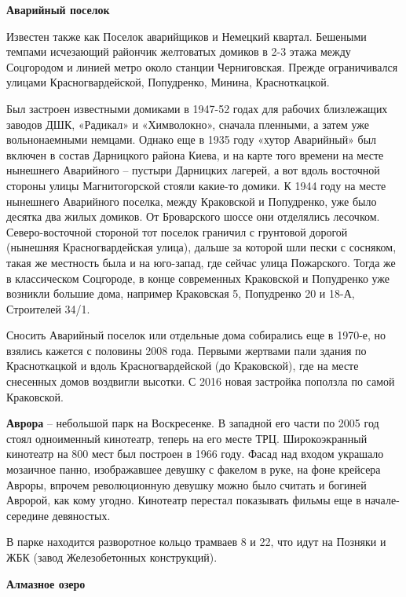 \textbf{Аварийный поселок}

Известен также как Поселок аварийщиков и Немецкий квартал. Бешеными темпами исчезающий райончик желтоватых домиков в 2-3 этажа между Соцгородом и линией метро около станции Черниговская. Прежде ограничивался улицами Красногвардейской, Попудренко, Минина, Красноткацкой. 

Был застроен известными домиками в 1947-52 годах для рабочих близлежащих заводов ДШК, «Радикал» и «Химволокно», сначала пленными, а затем уже вольнонаемными немцами. Однако еще в 1935 году «хутор Аварийный» был включен в состав Дарницкого района Киева, и на карте того времени на месте нынешнего Аварийного – пустыри Дарницких лагерей, а вот вдоль восточной стороны улицы Магнитогорской стояли какие-то домики. К 1944 году на месте нынешнего Аварийного поселка, между Краковской и Попудренко, уже было десятка два жилых домиков. От Броварского шоссе они отделялись лесочком. Северо-восточной стороной тот поселок граничил с грунтовой дорогой (нынешняя Красногвардейская улица), дальше за которой шли пески с сосняком, такая же местность была и на юго-запад, где сейчас улица Пожарского. Тогда же в классическом Соцгороде, в конце современных Краковской и Попудренко уже возникли большие дома, например Краковская 5, Попудренко 20 и 18-А, Строителей 34/1.

Сносить Аварийный поселок или отдельные дома собирались еще в 1970-е, но взялись кажется с половины 2008 года. Первыми жертвами пали здания по Красноткацкой и вдоль Красногвардейской (до Краковской), где на месте снесенных домов воздвигли высотки. С 2016 новая застройка поползла по самой Краковской.\\

\medskip

\textbf{Аврора} – небольшой парк на Воскресенке. В западной его части по 2005 год стоял одноименный кинотеатр, теперь на его месте ТРЦ. Широкоэкранный кинотеатр на 800 мест был построен в 1966 году. Фасад над входом украшало мозаичное панно, изображавшее девушку с факелом в руке, на фоне крейсера Авроры, впрочем революционную девушку можно было считать и богиней Авророй, как кому угодно. Кинотеатр перестал показывать фильмы еще в начале-середине девяностых.

В парке находится разворотное кольцо трамваев 8 и 22, что идут на Позняки и ЖБК (завод Железобетонных конструкций).\\

\medskip

\textbf{Алмазное озеро}

